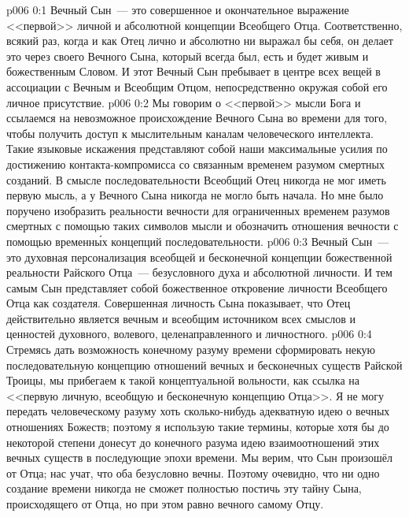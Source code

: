 \author{Божественный Советник}
\vs p006 0:1 Вечный Сын~--- это совершенное и окончательное выражение <<первой>> личной и абсолютной концепции Всеобщего Отца. Соответственно, всякий раз, когда и как Отец лично и абсолютно ни выражал бы себя, он делает это через своего Вечного Сына, который всегда был, есть и будет живым и божественным Словом. И этот Вечный Сын пребывает в центре всех вещей в ассоциации с Вечным и Всеобщим Отцом, непосредственно окружая собой его личное присутствие.
\vs p006 0:2 Мы говорим о <<первой>> мысли Бога и ссылаемся на невозможное происхождение Вечного Сына во времени для того, чтобы получить доступ к мыслительным каналам человеческого интеллекта. Такие языковые искажения представляют собой наши максимальные усилия по достижению контакта\hyp{}компромисса со связанным временем разумом смертных созданий. В смысле последовательности Всеобщий Отец никогда не мог иметь первую мысль, а у Вечного Сына никогда не могло быть начала. Но мне было поручено изобразить реальности вечности для ограниченных временем разумов смертных с помощью таких символов мысли и обозначить отношения вечности с помощью временн\'ых концепций последовательности.
\vs p006 0:3 Вечный Сын~--- это духовная персонализация всеобщей и бесконечной концепции божественной реальности Райского Отца~--- безусловного духа и абсолютной личности. И тем самым Сын представляет собой божественное откровение личности Всеобщего Отца как создателя. Совершенная личность Сына показывает, что Отец действительно является вечным и всеобщим источником всех смыслов и ценностей духовного, волевого, целенаправленного и личностного.
\vs p006 0:4 Стремясь дать возможность конечному разуму времени сформировать некую последовательную концепцию отношений вечных и бесконечных существ Райской Троицы, мы прибегаем к такой концептуальной вольности, как ссылка на <<первую личную, всеобщую и бесконечную концепцию Отца>>. Я не могу передать человеческому разуму хоть сколько\hyp{}нибудь адекватную идею о вечных отношениях Божеств; поэтому я использую такие термины, которые хотя бы до некоторой степени донесут до конечного разума идею взаимоотношений этих вечных существ в последующие эпохи времени. Мы верим, что Сын произошёл от Отца; нас учат, что оба безусловно вечны. Поэтому очевидно, что ни одно создание времени никогда не сможет полностью постичь эту тайну Сына, происходящего от Отца, но при этом равно вечного самому Отцу.
